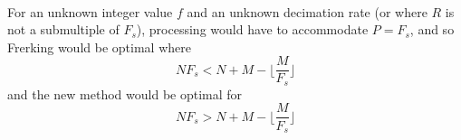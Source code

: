 \documentclass{article}
\begin{document}
        \paragraph{}
        For an unknown integer value $f$ and an unknown decimation rate (or where $R$ is not a submultiple of ${F}_s$), processing would have to accommodate $P = {F}_s$, and so Frerking would be optimal where
        \begin{equation}   
        N{F}_s < N + M - \lfloor{\frac{M}{{F}_s}}\rfloor
        \end{equation}
        and the new method would be optimal for 
        \begin{equation}   
        N{F}_s > N + M - \lfloor{\frac{M}{{F}_s}}\rfloor
        \end{equation}
\end{document}
